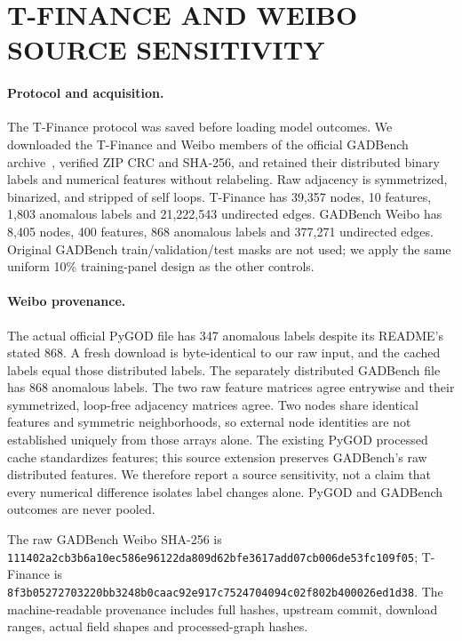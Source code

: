 \section{T-FINANCE AND WEIBO SOURCE SENSITIVITY}
\label{app:extensions}
\paragraph{Protocol and acquisition.}
The T-Finance protocol was saved before loading model outcomes. We downloaded the T-Finance and Weibo members of the official GADBench archive~\citep{tang2023gadbench}, verified ZIP CRC and SHA-256, and retained their distributed binary labels and numerical features without relabeling. Raw adjacency is symmetrized, binarized, and stripped of self loops. T-Finance has 39,357 nodes, 10 features, 1,803 anomalous labels and 21,222,543 undirected edges. GADBench Weibo has 8,405 nodes, 400 features, 868 anomalous labels and 377,271 undirected edges. Original GADBench train/validation/test masks are not used; we apply the same uniform 10\% training-panel design as the other controls.

\paragraph{Weibo provenance.}
The actual official PyGOD file has 347 anomalous labels despite its README's stated 868. A fresh download is byte-identical to our raw input, and the cached labels equal those distributed labels. The separately distributed GADBench file has 868 anomalous labels. The two raw feature matrices agree entrywise and their symmetrized, loop-free adjacency matrices agree. Two nodes share identical features and symmetric neighborhoods, so external node identities are not established uniquely from those arrays alone. The existing PyGOD processed cache standardizes features; this source extension preserves GADBench's raw distributed features. We therefore report a source sensitivity, not a claim that every numerical difference isolates label changes alone. PyGOD and GADBench outcomes are never pooled.

The raw GADBench Weibo SHA-256 is
\texttt{111402a2cb3b6a10\allowbreak ec586e96122da809\allowbreak d62bfe3617add07cb\allowbreak 006de53fc109f05};
T-Finance is
\texttt{8f3b05272703220b\allowbreak b3248b0caac92e91\allowbreak 7c7524704094c02f\allowbreak 802b400026ed1d38}.
The machine-readable provenance includes full hashes, upstream commit, download ranges, actual field shapes and processed-graph hashes.

